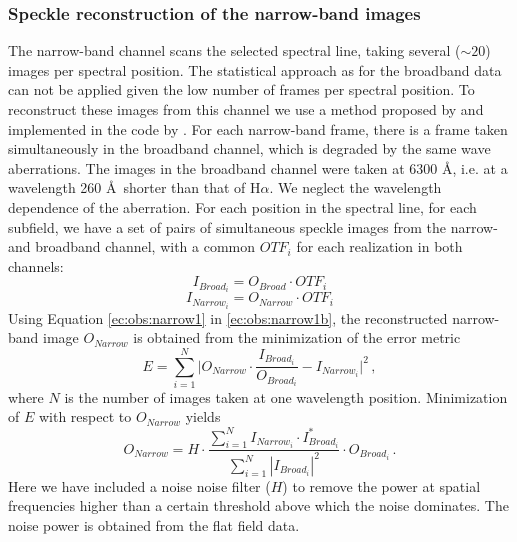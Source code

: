 \subsubsection{Speckle reconstruction of the narrow-band images\label{SIn}}
The narrow-band channel scans the selected spectral line, taking several ($\sim 20$) images per spectral position. The statistical approach as for the broadband data can not be applied given the low number of frames per spectral position. 
To reconstruct these images from this channel we use a method proposed by \cite{1992A&A...261..321K} and implemented in the code by \cite{2003PhDT.........2J}. For each narrow-band frame, there is a frame taken simultaneously in the broadband channel, which is degraded by the same wave aberrations. The images in the broadband channel were taken at 6300 \AA, i.e. at a wavelength 260 \AA\, shorter than that of H$\alpha$. We neglect the wavelength dependence of the aberration.
For each position in the spectral line, for each subfield, we have a set of pairs of simultaneous speckle images from the narrow- and broadband channel, with a common $OTF_{i}$ for each realization in both channels:
\begin{equation}
  I_{Broad_{i}} = O_{Broad} \cdot OTF_{i}
  \label{ec:obs:narrow1}
\end{equation}
\begin{equation}
   I_{Narrow_{i}} = O_{Narrow} \cdot OTF_{i}
  \label{ec:obs:narrow1b}
\end{equation}
Using Equation \ref{ec:obs:narrow1} in  \ref{ec:obs:narrow1b}, the reconstructed narrow-band image $O_{Narrow}$ is obtained from the minimization of the error metric
\begin{equation}
E= \sum_{i=1}^{N} \Big | O_{Narrow} \cdot \frac{I_{Broad_{i}}}{O_{Broad_{i}}}-I_{Narrow_{i}} \Big |^{2} \, ,
\label{ec:obs:narrow2}
\end{equation}
where $N$ is the number of images taken at one wavelength position. Minimization of $E$ with respect to $O_{Narrow}$ yields
\begin{equation}
  O_{Narrow} = H\cdot \frac{\sum_{i=1}^{N}I_{Narrow_{i}} \cdot I_{Broad_{i}}^{*}}{\sum_{i=1}^{N}|I_{Broad_{i}}|^{2}} \cdot O_{Broad_{i}} \, .
  \label{ec:obs:narrow3}
\end{equation}
Here we have included a noise noise filter ($H$) to remove the power at spatial frequencies higher than a certain threshold above which the noise dominates. The noise power is obtained from the flat field data.

